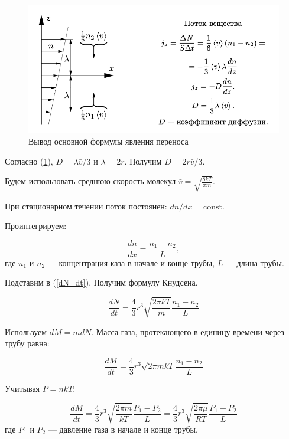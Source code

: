\documentclass[a4paper,12pt]{article} %
\begin{document}
\begin{figure}
  \centering
  \includegraphics[scale = 0.75]{images/eq.png}
  \caption{Вывод основной формулы явления переноса}
  \label{fig:eq}
\end{figure}

Согласно (\ref{fig:eq}), $D = \lambda \bar{v} / 3$ и $\lambda = 2r$. Получим $D = 2r \bar{v} / 3$. 

Будем использовать среднюю скорость молекул $\bar{v} = \sqrt{\frac{8kT}{\pi m}}$.

При стационарном течении поток постоянен: $dn/dx = \text{const}$. 

Проинтегрируем:

\begin{equation}
  \frac{dn}{dx} = \frac{n_1 - n_2}{L},
\end{equation}
где $n_1$ и $n_2$ — концентрация каза в начале и конце трубы, $L$ — длина трубы.

Подставим в (\ref{dN_dt}). Получим формулу Кнудсена.

\begin{equation}
  \frac{dN}{dt} = \frac{4}{3} r^3 \sqrt{\frac{2 \pi k T}{m}} \frac{n_1 - n_2}{L}
\end{equation}

Используем $dM = mdN$. Масса газа, протекающего в единицу времени через трубу равна:

\begin{equation}
  \frac{dM}{dt} = \frac{4}{3} r^3 \sqrt{2 \pi m k T} \frac{n_1 - n_2}{L}
\end{equation}

Учитывая $P = nkT$:

\begin{equation}
  \frac{dM}{dt} = \frac{4}{3} r^3 \sqrt{\frac{2 \pi m}{k T}}\frac{P_1 - P_2}{L} = \frac{4}{3} r^3 \sqrt{\frac{2 \pi \mu}{R T}}\frac{P_1 - P_2}{L} 
  \label{r3}
\end{equation}
где $P_1$ и $P_2$ — давление газа в начале и конце трубы.
\end{document}
